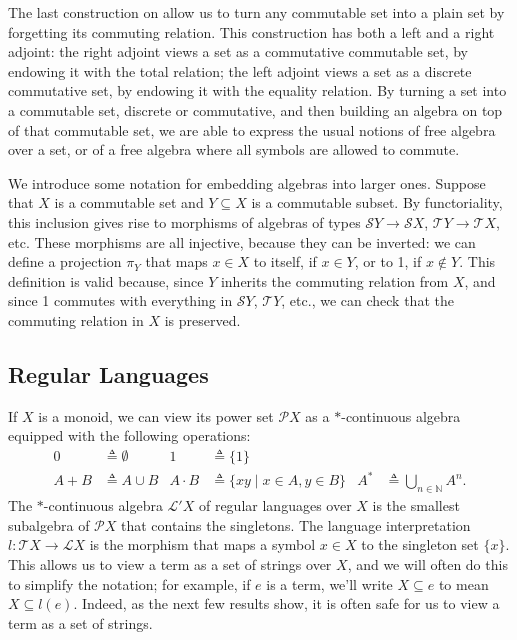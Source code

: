 \documentclass[a4paper,UKenglish,cleveref, autoref, thm-restate]{lipics-v2021}
\begin{document}
The last construction on  allow us to turn any
commutable set into a plain set by forgetting its commuting relation.  This
construction has both a left and a right adjoint: the right adjoint views a set
as a commutative commutable set, by endowing it with the total relation; the
left adjoint views a set as a discrete commutative set, by endowing it with the
equality relation.  By turning a set into a commutable set, discrete or
commutative, and then building an algebra on top of that commutable set, we are
able to express the usual notions of free algebra over a set, or of a free
algebra where all symbols are allowed to commute.

\begin{remark}
\label{rem:embeddings}
We introduce some notation for embedding algebras into larger ones.  Suppose
that $X$ is a commutable set and $Y  \subseteq  X$ is a commutable subset.  By
functoriality, this inclusion gives rise to morphisms of algebras of types
$\mathcal{S}Y  \to  \mathcal{S}X$, $\mathcal{T}Y  \to  \mathcal{T}X$, etc. These
morphisms are all injective, because they can be inverted: we can define a
projection $ \pi _Y$ that maps $x  \in  X$ to itself, if $x  \in  Y$, or to 1, if $x  \notin  Y$.
This definition is valid because, since $Y$ inherits the commuting relation from
$X$, and since 1 commutes with everything in $\mathcal{S}Y$, $\mathcal{T}Y$,
etc., we can check that the commuting relation in $X$ is preserved.
\end{remark}

\subsection{Regular Languages}

If $X$ is a monoid, we can view its power set $\mathcal{P}X$ as a $*$-continuous
algebra equipped with the following operations:
\begin{align*}
  0 &  \triangleq   \emptyset  &
  1 &  \triangleq  \{1\} \\
  A + B &  \triangleq  A  \cup  B &
  A  \cdot  B &  \triangleq  \{ xy  \mid  x  \in  A, y  \in  B \} &
  A^* &  \triangleq   \bigcup _{n  \in  \mathbb{N}} A^n.
\end{align*}
The $*$-continuous algebra $\mathcal{L}'X$ of regular languages over $X$ is the
smallest subalgebra of $\mathcal{P}X$ that contains the singletons.  The
language interpretation $l : \mathcal{T}X \to \mathcal{L}X$ is the morphism that
maps a symbol $x \in X$ to the singleton set $\{x\}$.  This allows us to view a
term as a set of strings over $X$, and we will often do this to simplify the
notation; for example, if $e$ is a term, we'll write $X \subseteq e$ to mean
$X \subseteq l(e)$.  Indeed, as the next few results show, it is often safe for
us to view a term as a set of strings.
\end{document}
